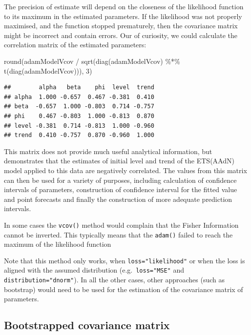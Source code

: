 \documentclass[
]{book}
\newenvironment{Shaded}{\begin{snugshade}}{\end{snugshade}}
\newcommand{\DecValTok}[1]{\textcolor[rgb]{0.00,0.00,0.81}{#1}}
\newcommand{\FunctionTok}[1]{\textcolor[rgb]{0.00,0.00,0.00}{#1}}
\newcommand{\NormalTok}[1]{#1}
\newcommand{\SpecialCharTok}[1]{\textcolor[rgb]{0.00,0.00,0.00}{#1}}
\theoremstyle{definition}
\theoremstyle{definition}
\theoremstyle{definition}
\theoremstyle{definition}
\theoremstyle{remark}
\begin{document}
The precision of estimate will depend on the closeness of the likelihood function to its maximum in the estimated parameters. If the likelihood was not properly maximised, and the function stopped prematurely, then the covariance matrix might be incorrect and contain errors. Our of curiosity, we could calculate the correlation matrix of the estimated parameters:

\begin{Shaded}
\begin{Highlighting}[]
\FunctionTok{round}\NormalTok{(adamModelVcov }\SpecialCharTok{/}
        \FunctionTok{sqrt}\NormalTok{(}\FunctionTok{diag}\NormalTok{(adamModelVcov) }\SpecialCharTok{\%*\%}
               \FunctionTok{t}\NormalTok{(}\FunctionTok{diag}\NormalTok{(adamModelVcov))), }\DecValTok{3}\NormalTok{)}
\end{Highlighting}
\end{Shaded}

\begin{verbatim}
##        alpha   beta    phi  level  trend
## alpha  1.000 -0.657  0.467 -0.381  0.410
## beta  -0.657  1.000 -0.803  0.714 -0.757
## phi    0.467 -0.803  1.000 -0.813  0.870
## level -0.381  0.714 -0.813  1.000 -0.960
## trend  0.410 -0.757  0.870 -0.960  1.000
\end{verbatim}

This matrix does not provide much useful analytical information, but demonstrates that the estimates of initial level and trend of the ETS(AAdN) model applied to this data are negatively correlated. The values from this matrix can then be used for a variety of purposes, including calculation of confidence intervals of parameters, construction of confidence interval for the fitted value and point forecasts and finally the construction of more adequate prediction intervals.

In some cases the \texttt{vcov()} method would complain that the Fisher Information cannot be inverted. This typically means that the \texttt{adam()} failed to reach the maximum of the likelihood function

Note that this method only works, when \texttt{loss="likelihood"} or when the loss is aligned with the assumed distribution (e.g.~\texttt{loss="MSE"} and \texttt{distribution="dnorm"}). In all the other cases, other approaches (such as bootstrap) would need to be used for the estimation of the covariance matrix of parameters.

\hypertarget{bootstrapped-covariance-matrix}{%
\subsection{Bootstrapped covariance matrix}\label{bootstrapped-covariance-matrix}}
\end{document}
